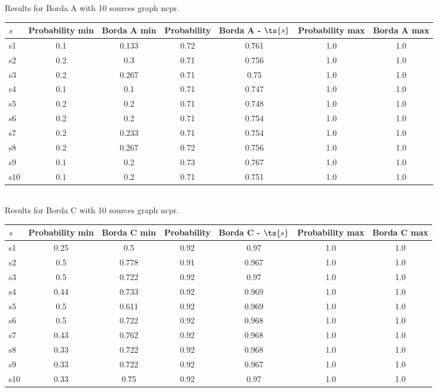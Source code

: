 \documentclass{article}
\begin{document}
\noindent Results for Borda A with 10 sources graph ncpr.

\noindent\begin{tabular}{|l|c|c|c|c|c|c|}
\hline
$s$& Probability min & Borda A min & Probability & Borda A - $\ts{s}$ & Probability max & Borda A max\\
\hline
s1 &0.1 & 0.133 & 0.72 & 0.761 & 1.0 & 1.0\\
\hline
s2 &0.2 & 0.3 & 0.71 & 0.756 & 1.0 & 1.0\\
\hline
s3 &0.2 & 0.267 & 0.71 & 0.75 & 1.0 & 1.0\\
\hline
s4 &0.1 & 0.1 & 0.71 & 0.747 & 1.0 & 1.0\\
\hline
s5 &0.2 & 0.2 & 0.71 & 0.748 & 1.0 & 1.0\\
\hline
s6 &0.2 & 0.2 & 0.71 & 0.754 & 1.0 & 1.0\\
\hline
s7 &0.2 & 0.233 & 0.71 & 0.754 & 1.0 & 1.0\\
\hline
s8 &0.2 & 0.267 & 0.72 & 0.756 & 1.0 & 1.0\\
\hline
s9 &0.1 & 0.2 & 0.73 & 0.767 & 1.0 & 1.0\\
\hline
s10 &0.1 & 0.2 & 0.71 & 0.751 & 1.0 & 1.0\\
\hline
\end{tabular}\\

\noindent Results for Borda C with 10 sources graph ncpr.

\noindent\begin{tabular}{|l|c|c|c|c|c|c|}
\hline
$s$& Probability min & Borda C min & Probability & Borda C - $\ts{s}$ & Probability max & Borda C max\\
\hline
s1 &0.25 & 0.5 & 0.92 & 0.97 & 1.0 & 1.0\\
\hline
s2 &0.5 & 0.778 & 0.91 & 0.967 & 1.0 & 1.0\\
\hline
s3 &0.5 & 0.722 & 0.92 & 0.97 & 1.0 & 1.0\\
\hline
s4 &0.44 & 0.733 & 0.92 & 0.969 & 1.0 & 1.0\\
\hline
s5 &0.5 & 0.611 & 0.92 & 0.969 & 1.0 & 1.0\\
\hline
s6 &0.5 & 0.722 & 0.92 & 0.968 & 1.0 & 1.0\\
\hline
s7 &0.43 & 0.762 & 0.92 & 0.968 & 1.0 & 1.0\\
\hline
s8 &0.33 & 0.722 & 0.92 & 0.968 & 1.0 & 1.0\\
\hline
s9 &0.33 & 0.722 & 0.92 & 0.967 & 1.0 & 1.0\\
\hline
s10 &0.33 & 0.75 & 0.92 & 0.97 & 1.0 & 1.0\\
\hline
\end{tabular}\\
\end{document}
